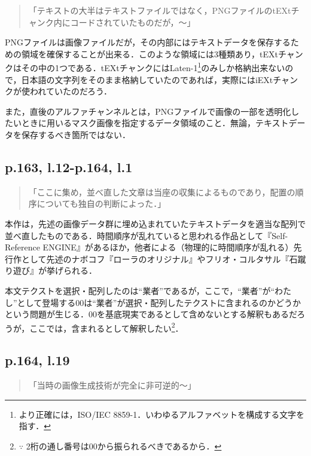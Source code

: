 \documentclass[10pt, a5paper, twoside]{jsarticle}
\theoremstyle{definition}
\begin{document}
			\begin{quote}
				
				「テキストの大半はテキストファイルではなく，PNGファイルのtEXtチャンク内にコードされていたものだが，〜」

			\end{quote}

			PNGファイルは画像ファイルだが，その内部にはテキストデータを保存するための領域を確保することが出来る．このような領域には3種類あり，tEXtチャンクはその中の1つである．tEXtチャンクにはLaten-1\footnote{より正確には，ISO/IEC 8859-1．いわゆるアルファベットを構成する文字を指す．}のみしか格納出来ないので，日本語の文字列をそのまま格納していたのであれば，実際にはiEXtチャンクが使われていたのだろう．

			また，直後のアルファチャンネルとは，PNGファイルで画像の一部を透明化したいときに用いるマスク画像を指定するデータ領域のこと．無論，テキストデータを保存するべき箇所ではない．

		\subsection{p.163, l.12-p.164, l.1}

			\begin{quote}
				
				「ここに集め，並べ直した文章は当座の収集によるものであり，配置の順序についても独自の判断によった．」

			\end{quote}

			本作は，先述の画像データ群に埋め込まれていたテキストデータを適当な配列で並べ直したものである．時間順序が乱れていると思われる作品として『Self-Reference ENGINE』があるほか，他者による（物理的に時間順序が乱れる）先行作として先述のナボコフ『ローラのオリジナル』やフリオ・コルタサル『石蹴り遊び』が挙げられる．

			本文テクストを選択・配列したのは“業者”であるが，ここで，“業者”が“わたし”として登場する00は“業者”が選択・配列したテクストに含まれるのかどうかという問題が生じる．00を基底現実であるとして含めないとする解釈もあるだろうが，ここでは，含まれるとして解釈したい\footnote{$\because$ 2桁の通し番号は00から振られるべきであるから．}．

		\subsection{p.164, l.19}

			\begin{quote}

				「当時の画像生成技術が完全に非可逆的〜」
				
			\end{quote}
\end{document}
